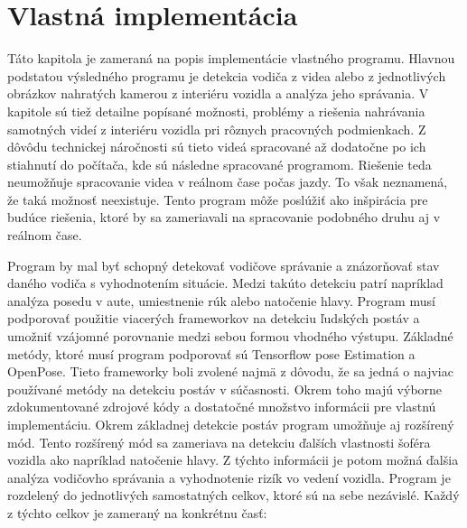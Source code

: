 \documentclass[slovak,master,dept460,male,cpp,cpdeclaration]{diploma}
\begin{document}
\section{Vlastná implementácia}
\label{sec:Vlastná implementácia}
Táto kapitola je zameraná na  popis implementácie vlastného programu. Hlavnou podstatou výsledného programu je detekcia vodiča z videa alebo z jednotlivých obrázkov nahratých kamerou z interiéru vozidla a analýza jeho správania. V kapitole sú tiež detailne popísané možnosti, problémy a riešenia nahrávania samotných videí z interiéru vozidla pri rôznych pracovných podmienkach. Z dôvôdu technickej náročnosti sú tieto videá spracované až dodatočne po ich stiahnutí do počítača, kde sú následne spracované  programom. Riešenie teda neumožňuje spracovanie videa v reálnom čase počas jazdy. To však neznamená, že taká možnosť neexistuje. Tento program môže poslúžiť ako inšpirácia pre budúce riešenia, ktoré by sa zameriavali na spracovanie podobného druhu aj v reálnom čase.\par
Program  by mal byť schopný detekovať vodičove správanie a znázorňovať stav daného vodiča s vyhodnotením situácie. Medzi takúto detekciu patrí napríklad analýza posedu v aute, umiestnenie rúk alebo natočenie hlavy. Program musí podporovať použitie viacerých frameworkov na detekciu ľudských postáv a umožniť vzájomné porovnanie medzi sebou formou vhodného výstupu. Základné metódy, ktoré musí program podporovať sú Tensorflow pose Estimation a OpenPose. Tieto frameworky boli zvolené najmä z dôvodu, že sa jedná o najviac používané metódy na detekciu postáv v súčasnosti. Okrem toho majú výborne zdokumentované zdrojové kódy a dostatočné množstvo informácii pre vlastnú implementáciu. Okrem základnej detekcie postáv program umožňuje aj rozšírený mód. Tento rozšírený mód sa zameriava na detekciu ďalších vlastnosti šoféra vozidla ako napríklad natočenie hlavy. Z týchto informácii je potom možná ďalšia analýza vodičovho správania a vyhodnotenie rizík vo vedení vozidla. Program je rozdelený do jednotlivých samostatných celkov, ktoré sú na sebe nezávislé. Každý z týchto celkov je zameraný na konkrétnu časť:
\end{document}
